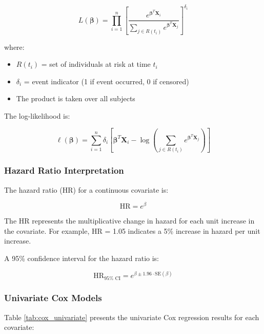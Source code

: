 \documentclass[12pt,a4paper]{article}
\begin{document}
\begin{equation}
L(\boldsymbol{\beta}) = \prod_{i=1}^{n} \left[\frac{e^{\boldsymbol{\beta}^T \mathbf{X}_i}}{\sum_{j \in R(t_i)} e^{\boldsymbol{\beta}^T \mathbf{X}_j}}\right]^{\delta_i}
\label{eq:partial_likelihood}
\end{equation}

where:
\begin{itemize}
    \item \(R(t_i)\) = set of individuals at risk at time \(t_i\)
    \item \(\delta_i\) = event indicator (1 if event occurred, 0 if censored)
    \item The product is taken over all subjects
\end{itemize}

The log-likelihood is:

\begin{equation}
\ell(\boldsymbol{\beta}) = \sum_{i=1}^{n} \delta_i \left[\boldsymbol{\beta}^T \mathbf{X}_i - \log\left(\sum_{j \in R(t_i)} e^{\boldsymbol{\beta}^T \mathbf{X}_j}\right)\right]
\label{eq:log_likelihood}
\end{equation}

\subsubsection{Hazard Ratio Interpretation}

The hazard ratio (HR) for a continuous covariate is:

\begin{equation}
\text{HR} = e^{\beta}
\label{eq:hazard_ratio}
\end{equation}

The HR represents the multiplicative change in hazard for each unit increase in the covariate. For example, HR = 1.05 indicates a 5\% increase in hazard per unit increase.

A 95\% confidence interval for the hazard ratio is:

\begin{equation}
\text{HR}_{95\% \text{ CI}} = e^{\beta \pm 1.96 \cdot \text{SE}(\beta)}
\label{eq:hr_ci}
\end{equation}

\subsubsection{Univariate Cox Models}

Table \ref{tab:cox_univariate} presents the univariate Cox regression results for each covariate:
\end{document}
